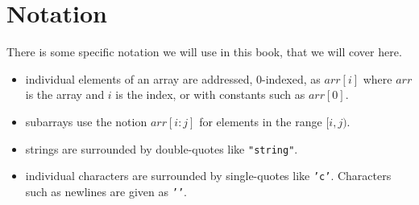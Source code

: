 \section*{Notation}

There is some specific notation we will use in this book, that we will cover here.
\begin{itemize}
\item individual elements of an array are addressed, 0-indexed, as $arr[i]$ where $arr$ is the array and $i$ is the index, or with constants such as $arr[0]$.
\item subarrays use the notion $arr[i:j]$ for elements in the range $[i,j)$.
\item strings are surrounded by double-quotes like \texttt{"string"}.
\item individual characters are surrounded by single-quotes like \texttt{'c'}. Characters such as newlines are given as \texttt{'\n'}.
\end{itemize}
